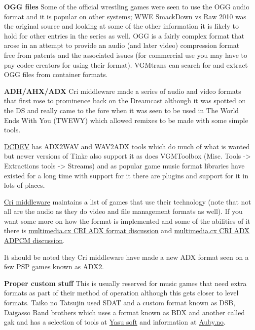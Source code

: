 \documentclass[
]{book}
\begin{document}
\textbf{OGG files} Some of the official wrestling games were seen to use the OGG audio format and it is popular on other systems; WWE SmackDown vs Raw 2010 was the original source and looking at some of the other information it is likely to hold for other entries in the series as well. OGG is a fairly complex format that arose in an attempt to provide an audio (and later video) compression format free from patents and the associated issues (for commercial use you may have to pay codec creators for using their format). VGMtrans can search for and extract OGG files from container formats.

\textbf{ADH/AHX/ADX} Cri middleware made a series of audio and video formats that first rose to prominence back on the Dreamcast although it was spotted on the DS and really came to the fore when it was seen to be used in The World Ends With You (TWEWY) which allowed remixes to be made with some simple tools.

\href{http://www.geocities.co.jp/Playtown/2004/dcdev/dcdev.html}{DCDEV} has ADX2WAV and WAV2ADX tools which do much of what is wanted but newer versions of Tinke also support it as does VGMToolbox (Misc. Tools -\textgreater{} Extractions tools -\textgreater{} Streams) and as popular game music format libraries have existed for a long time with support for it there are plugins and support for it in lots of places.

\href{http://www.cri-mw.com/product/adoption/platform/ds.html}{Cri middleware} maintains a list of games that use their technology (note that not all are the audio as they do video and file management formats as well). If you want some more on how the format is implemented and some of the abilities of it there is \href{http://wiki.multimedia.cx/index.php?title=CRI_ADX_file}{multimedia.cx CRI ADX format discussion} and \href{http://wiki.multimedia.cx/index.php?title=CRI_ADX_ADPCM}{multimedia.cx CRI ADX ADPCM discussion}.

It should be noted they Cri middleware have made a new ADX format seen on a few PSP games known as ADX2.

\textbf{Proper custom stuff} This is usually reserved for music games that need extra formats as part of their method of operation although this gets closer to level formats. Taiko no Tatsujin used SDAT and a custom format known as DSB, Daigasso Band brothers which uses a format known as BDX and another called gak and has a selection of tools at \href{http://home.usay.jp/pc/etc/nds/}{Yasu soft} and information at \href{http://www.auby.no/wiki/index.php?title=Band_Brothers_DX}{Auby.no}.
\end{document}
